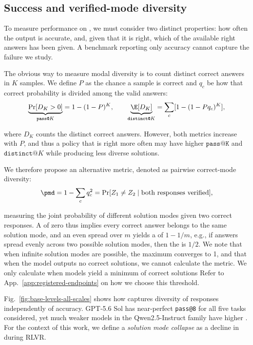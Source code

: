 \subsection{Success and verified-mode diversity}
\label{sec:collapse-metrics}

To measure performance on \mb{}, we must consider two distinct properties: how often the output is accurate, and, given that it is right, which of the available right answers has been given. 
A benchmark reporting only accuracy cannot capture the failure we study.

The obvious way to measure modal diversity is to count distinct correct answers in $K$ samples. We define $P$ as the chance a sample is correct and $q_c$ be how that correct probability is divided among the valid answers:
\vspace{-0.05em}
\begin{equation}
 \underbrace{\Pr[D_K>0]}_{\texttt{pass@}K}=1-(1-P)^K,
 \qquad
 \underbrace{\E[D_K]}_{\texttt{distinct@}K}
 =\sum_c[1-(1-Pq_c)^K],
 \label{eq:main-occupancy}
\end{equation}
\vspace{-1em}

where $D_K$ counts the distinct correct answers. However, both metrics increase with $P$, and thus a policy that is right more often may have higher $\texttt{pass@K}$ and $\texttt{distinct@}K$ while producing less diverse solutions.

We therefore propose an alternative metric, denoted as pairwise correct-mode diversity:
\begin{equation}
 \pmd = 1-\sum_c q_c^2
 = \Pr[Z_1\ne Z_2\mid \text{both responses verified}],
 \label{eq:main-pmd}
\end{equation}
\vspace{-1.2em}

measuring the joint probability of different solution modes given two correct responses. A \pmd{} of zero thus implies every correct answer belongs to the same solution mode, and an even spread over $m$ yields a \pmd{} of $1-1/m$, e.g., if answers spread evenly across two possible solution modes, then the \pmd{} is $1/2$. We note that when infinite solution modes are possible, the maximum \pmd{} converges to 1, and that when the model outputs no correct solutions, we cannot calculate the metric. We only calculate \pmd{} when models yield a minimum of correct solutions  Refer to App.~\ref{app:registered-endpoints} on how we choose this threshold. 

Fig.~\ref{fig:base-levels-all-scales} shows how \pmd{} captures diversity of responses independently of accuracy. GPT-5.6 Sol has near-perfect \texttt{pass@8} for all five tasks considered, yet much weaker models in the Qwen2.5-Instruct family have higher \pmd{}. 
For the context of this work, we define a \textit{solution mode collapse} as a decline in \pmd{} during RLVR.   

